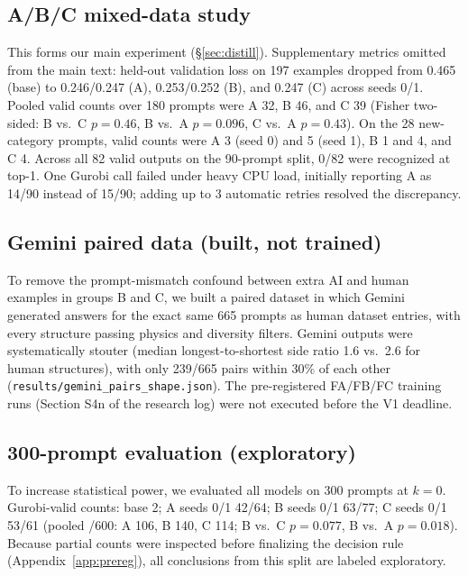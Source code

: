 \documentclass{article}
\begin{document}
\subsection{A/B/C mixed-data study}
\label{ex:mix}
This forms our main experiment (\S\ref{sec:distill}). Supplementary metrics omitted from the main text: held-out validation loss on 197 examples dropped from 0.465 (base) to 0.246/0.247 (A), 0.253/0.252 (B), and 0.247 (C) across seeds 0/1. Pooled valid counts over 180 prompts were A 32, B 46, and C 39 (Fisher two-sided: B vs.\ C $p{=}0.46$, B vs.\ A $p{=}0.096$, C vs.\ A $p{=}0.43$). On the 28 new-category prompts, valid counts were A 3 (seed 0) and 5 (seed 1), B 1 and 4, and C 4. Across all 82 valid outputs on the 90-prompt split, 0/82 were recognized at top-1. One Gurobi call failed under heavy CPU load, initially reporting A as 14/90 instead of 15/90; adding up to 3 automatic retries resolved the discrepancy.

\subsection{Gemini paired data (built, not trained)}
\label{ex:gemini}
To remove the prompt-mismatch confound between extra AI and human examples in groups B and C, we built a paired dataset in which Gemini generated answers for the exact same 665 prompts as human dataset entries, with every structure passing physics and diversity filters. Gemini outputs were systematically stouter (median longest-to-shortest side ratio 1.6 vs.\ 2.6 for human structures), with only 239/665 pairs within 30\% of each other (\texttt{results/gemini\_pairs\_shape.json}). The pre-registered FA/FB/FC training runs (Section S4n of the research log) were not executed before the V1 deadline.

\subsection{300-prompt evaluation (exploratory)}
\label{ex:eval300}
To increase statistical power, we evaluated all models on 300 prompts at $k{=}0$. Gurobi-valid counts: base 2; A seeds 0/1 42/64; B seeds 0/1 63/77; C seeds 0/1 53/61 (pooled /600: A 106, B 140, C 114; B vs.\ C $p=0.077$, B vs.\ A $p=0.018$). Because partial counts were inspected before finalizing the decision rule (Appendix~\ref{app:prereg}), all conclusions from this split are labeled exploratory.
\end{document}
